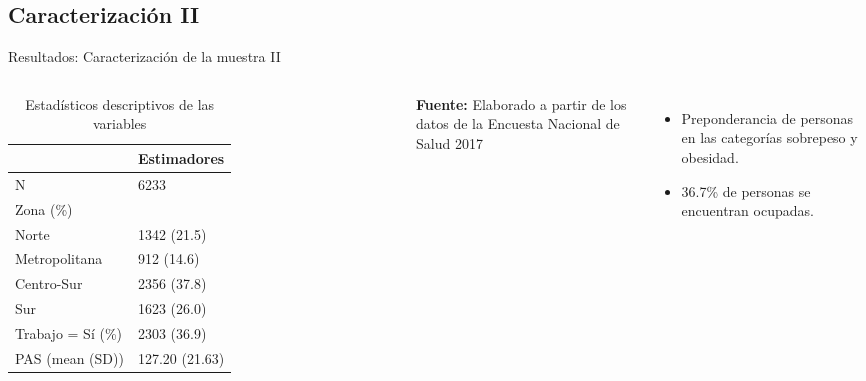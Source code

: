 \documentclass[aspectratio=169]{beamer}
\newcommand{\pro}{\item [$\blacktriangleright$]}
\begin{document}
\subsection*{Caracterización II}
\begin{frame}{Resultados: Caracterización de la muestra II}
        \begin{columns}[onlytextwidth]
\begin{table}{}
\caption{Estadísticos descriptivos de las variables}
    \centering
    \small
\begin{tabular}{l l}
\toprule
  & Estimadores \\
\midrule
N & 6233\\
Zona (\%) & \\
\-\hspace{5mm} \small Norte & 1342 (21.5)\\
\-\hspace{5mm} \small Metropolitana & 912 (14.6)\\
\-\hspace{5mm} \small Centro-Sur & 2356 (37.8)\\
\-\hspace{5mm} \small Sur & 1623 (26.0)\\
Trabajo = Sí (\%) & 2303 (36.9)\\
PAS (mean (SD)) & 127.20 (21.63)\\
\bottomrule
\end{tabular}
    \vspace{1ex}
    
    {\raggedright \small \textbf{Fuente:} Elaborado a partir de los datos de la Encuesta Nacional de Salud 2017 \par}
\end{table}
    \begin{itemize}
        \pro Preponderancia de personas en las categorías sobrepeso y obesidad.
        \pro 36.7\% de personas se encuentran ocupadas.
    \end{itemize}
    \end{columns}
\end{frame}

\end{document}
